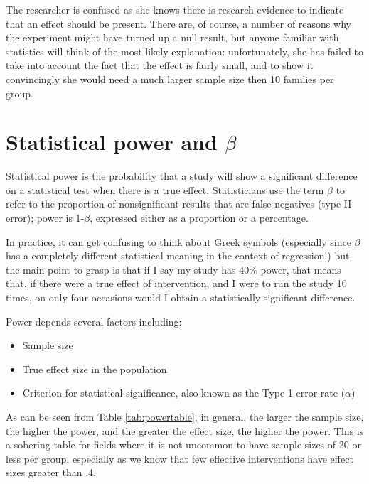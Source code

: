 \documentclass{krantz}
\providecommand{\tightlist}{%
\setlength{\itemsep}{0pt}\setlength{\parskip}{0pt}}
\begin{document}
The researcher is confused as she knows there is research evidence to indicate that an effect should be present. There are, of course, a number of reasons why the experiment might have turned up a null result, but anyone familiar with statistics will think of the most likely explanation: unfortunately, she has failed to take into account the fact that the effect is fairly small, and to show it convincingly she would need a much larger sample size then 10 families per group.

\hypertarget{statistical-power-and-beta}{%
\section{\texorpdfstring{Statistical power and \(\beta\)}{Statistical power and \textbackslash beta}}\label{statistical-power-and-beta}}

Statistical power is the probability that a study will show a significant difference on a statistical test when there is a true effect. Statisticians use the term \(\beta\) to refer to the proportion of nonsignificant results that are false negatives (type II error); power is 1-\(\beta\), expressed either as a proportion or a percentage.

In practice, it can get confusing to think about Greek symbols (especially since \(\beta\) has a completely different statistical meaning in the context of regression!) but the main point to grasp is that if I say my study has 40\% power, that means that, if there were a true effect of intervention, and I were to run the study 10 times, on only four occasions would I obtain a statistically significant difference.

Power depends several factors including:

\begin{itemize}
\tightlist
\item
  Sample size
\item
  True effect size in the population
\item
  Criterion for statistical significance, also known as the Type 1 error rate (\(\alpha\))
\end{itemize}

As can be seen from Table \ref{tab:powertable}, in general, the larger the sample size, the higher the power, and the greater the effect size, the higher the power. This is a sobering table for fields where it is not uncommon to have sample sizes of 20 or less per group, especially as we know that few effective interventions have effect sizes greater than .4.
\end{document}
